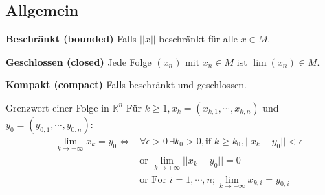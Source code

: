 \subsection{Allgemein}
\textbf{Beschränkt (bounded)} Falls $||x||$ beschränkt für alle $x \in M$.

\textbf{Geschlossen (closed)} Jede Folge $(x_n)$ mit $x_n \in M$ ist $\lim (x_n) \in M$.

\textbf{Kompakt (compact)} Falls beschränkt und geschlossen.

\begin{Definition}{Grenzwert einer Folge in $\mathbb{R}^n$}{}
Für $k\geq1, x_k=(x_{k,1},\cdots,x_{k,n})$ und $y_0 = (y_{0,1}, \cdots, y_{0,n}) $: 
\begin{align*}    
\boxed{\lim\limits_{k \rightarrow +\infty}{x_k} = y_0} \iff &\forall \epsilon > 0 \, \exists k_0 > 0, \text{if } k \geq k_0, ||x_k - y_0|| < \epsilon\\
&\text{or } \lim\limits_{k \rightarrow +\infty}{||x_k-y_0||} = 0\\
&\text{or For } i=1,\cdots, n; \lim\limits_{k \rightarrow +\infty}{x_{k,i}} = y_{0,i}
\end{align*}

\end{Definition}